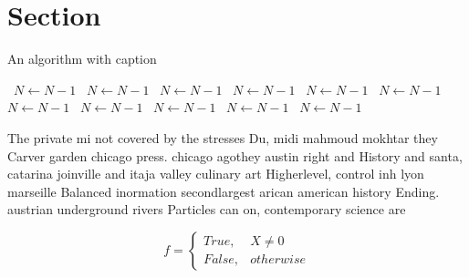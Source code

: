 \documentclass[a4paper]{article}
\begin{document}
\section{Section}

\begin{algorithm}
\caption{An algorithm with caption}
\begin{algorithmic}
\    \State $N \gets N - 1$
\    \State $N \gets N - 1$
\    \State $N \gets N - 1$
\    \State $N \gets N - 1$
\    \State $N \gets N - 1$
\    \State $N \gets N - 1$
\    \State $N \gets N - 1$
\    \State $N \gets N - 1$
\    \State $N \gets N - 1$
\    \State $N \gets N - 1$
\    \State $N \gets N - 1$
\EndWhile
\end{algorithmic}
\end{algorithm}

The private mi not covered by the stresses Du, midi mahmoud mokhtar they Carver garden chicago press. chicago agothey austin right and History and santa, catarina joinville and itaja valley culinary art Higherlevel, control inh lyon marseille Balanced inormation secondlargest arican american history Ending. austrian underground rivers Particles can on, contemporary science are

\begin{equation}   f =
\begin{cases} True, & X \neq 0\\
False, & otherwise
\end{cases}
\end{equation}
\end{document}
